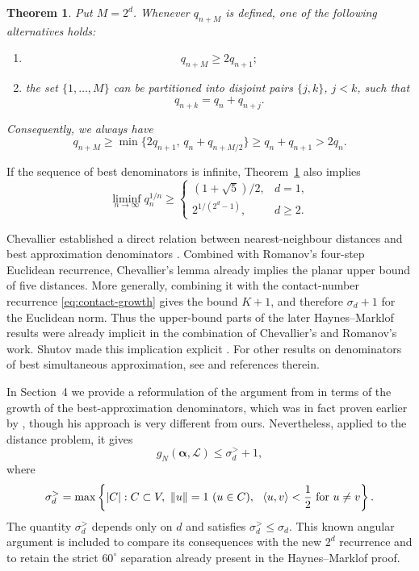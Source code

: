 \documentclass[11pt,reqno]{amsart}
\newtheorem{theorem}{Theorem}[section]
\theoremstyle{definition}
\newcommand{\0}{\mbf 0}%
\renewcommand{\text}{\textup}
\newcommand{\cL}{\mathcal L}
\newcommand{\balpha}{\boldsymbol{\alpha}}
\begin{document}
\begin{theorem}\label{thm:growth}
Put $M=2^d$. Whenever $q_{n+M}$ is defined, one of the following alternatives
holds:
\begin{enumerate}
\item
$$
 q_{n+M}\ge2q_{n+1};
$$
\item the set $\{1,\ldots,M\}$ can be partitioned into disjoint pairs $\{j,k\}$,
$j<k$, such that
\begin{equation}\label{eq:pairing-recurrence}
 q_{n+k}=q_n+q_{n+j}.
\end{equation}
\end{enumerate}
Consequently, we always have
\begin{equation}\label{eq:refined-growth}
 q_{n+M}\ge
 \min\{2q_{n+1},\,q_n+q_{n+M/2}\}
 \ge q_n+q_{n+1}>2q_n.
\end{equation}
\end{theorem}

If the sequence of best denominators is infinite, Theorem~\ref{thm:growth}
also implies
$$
 \liminf_{n\to\infty}q_n^{1/n}\ge
 \begin{cases}
  (1+\sqrt5)/2,&d=1,\\
  2^{1/(2^d-1)},&d\ge2.
 \end{cases}
$$

Chevallier established a direct relation between nearest-neighbour distances
and best approximation denominators
\cite{ChevallierDistances1996,Chevallier1996}. Combined with Romanov's
four-step Euclidean recurrence, Chevallier's lemma already implies the planar
upper bound of five distances. More generally, combining it with the
contact-number recurrence \eqref{eq:contact-growth} gives the bound $K+1$, and
therefore $\sigma_d+1$ for the Euclidean norm. Thus the upper-bound parts of
the later Haynes--Marklof results were already implicit in the combination of
Chevallier's and Romanov's work. Shutov made this implication explicit
\cite{Shutov2024}. For other results on denominators of best simultaneous approximation, see \cite{MR4732677} and references therein.

In Section~4 we provide a reformulation of the argument from \cite{HaynesMarklof2022} in terms of the growth of the best-approximation denominators, which was in fact proven earlier by \cite{Romanov2006}, though his approach is very different from ours. Nevertheless, applied to the distance problem, it gives
$$
 g_N(\balpha,\cL)\le \sigma_d^{>}+1,
$$
where
$$
 \sigma_d^{>}
 =\max\left\{|C|:C\subset V,\ \|u\|=1\ (u\in C),\
    \ \langle u,v\rangle<\frac12\ \text{for }u\ne v\right\}.
$$
The quantity $\sigma_d^{>}$ depends only on $d$ and satisfies
$\sigma_d^{>}\le\sigma_d$. This known angular argument is included to compare
its consequences with the new $2^d$ recurrence and to retain the strict
$60^\circ$ separation already present in the Haynes--Marklof proof.
\end{document}
